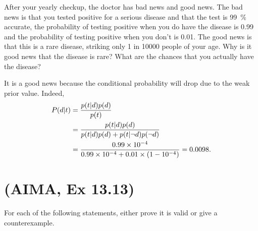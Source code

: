 \documentclass[11pt, a4paper]{article}
\begin{document}
After your yearly checkup, the doctor has bad news and good news. The bad news is that you tested positive for a serious disease and that the test is \qty{99}{\percent} accurate, \ie{} the probability of testing positive when you do have the disease is \num{0.99} and the probability of testing positive when you don't is \num{0.01}. The good news is that this is a rare disease, striking only 1 in \num{10000} people of your age. Why is it good news that the disease is rare? What are the chances that you actually have the disease?

\begin{solution}
    It is a good news because the conditional probability will drop due to the weak prior value. Indeed,
    \begin{align*}
        P(d \vert t) & = \frac{p(t \vert d) p(d)}{p(t)} \\
        & = \frac{p(t \vert d) p(d)}{p(t \vert d) p(d) + p(t \vert \neg d) p(\neg d)} \\
        & = \frac{0.99 \times \num{e-4}}{0.99 \times \num{e-4} + 0.01 \times (1 - \num{e-4})} = \num{0.0098} .
    \end{align*}
\end{solution}

\newpage

\section{(AIMA, Ex 13.13)}

For each of the following statements, either prove it is valid or give a counterexample.
\end{document}
